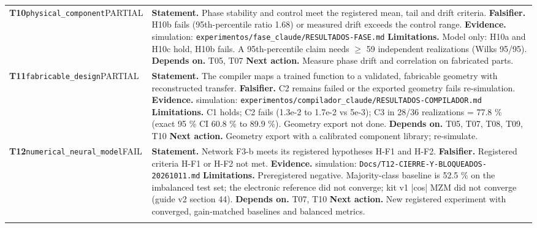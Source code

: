 \begin{longtable}{@{}>{\raggedright\arraybackslash}p{2.35cm}>{\raggedright\arraybackslash}p{13.2cm}@{}}
\textbf{T10}\newline \texttt{physical\_\allowbreak{}component}\newline PARTIAL & \textbf{Statement.} Phase stability and control meet the registered mean, tail and drift criteria. \newline \textbf{Falsifier.} H10b fails (95th-percentile ratio 1.68) or measured drift exceeds the control range. \newline \textbf{Evidence.} simulation: \texttt{experimentos/\allowbreak{}fase\_\allowbreak{}claude/\allowbreak{}RESULTADOS-FASE.md} \newline \textbf{Limitations.} Model only: H10a and H10c hold, H10b fails. A 95th-percentile claim needs $\ge$ 59 independent realizations (Wilks 95/\allowbreak{}95). \newline \textbf{Depends on.} T05, T07 \newline \textbf{Next action.} Measure phase drift and correlation on fabricated parts. \\ \addlinespace[2pt]
\textbf{T11}\newline \texttt{fabricable\_\allowbreak{}design}\newline PARTIAL & \textbf{Statement.} The compiler maps a trained function to a validated, fabricable geometry with reconstructed transfer. \newline \textbf{Falsifier.} C2 remains failed or the exported geometry fails re-simulation. \newline \textbf{Evidence.} simulation: \texttt{experimentos/\allowbreak{}compilador\_\allowbreak{}claude/\allowbreak{}RESULTADOS-COMPILADOR.md} \newline \textbf{Limitations.} C1 holds; C2 fails (1.3e-2 to 1.7e-2 vs 5e-3); C3 in 28/\allowbreak{}36 realizations = 77.8 \% (exact 95 \% CI 60.8 \% to 89.9 \%). Geometry export not done. \newline \textbf{Depends on.} T05, T07, T08, T09, T10 \newline \textbf{Next action.} Geometry export with a calibrated component library; re-simulate. \\ \addlinespace[2pt]
\textbf{T12}\newline \texttt{numerical\_\allowbreak{}neural\_\allowbreak{}model}\newline FAIL & \textbf{Statement.} Network F3-b meets its registered hypotheses H-F1 and H-F2. \newline \textbf{Falsifier.} Registered criteria H-F1 or H-F2 not met. \newline \textbf{Evidence.} simulation: \texttt{Docs/\allowbreak{}T12-CIERRE-Y-BLOQUEADOS-20261011.md} \newline \textbf{Limitations.} Preregistered negative. Majority-class baseline is 52.5 \% on the imbalanced test set; the electronic reference did not converge; kit v1 |cos| MZM did not converge (guide v2 section 44). \newline \textbf{Depends on.} T07, T10 \newline \textbf{Next action.} New registered experiment with converged, gain-matched baselines and balanced metrics. \\ \addlinespace[2pt]

\end{longtable}
